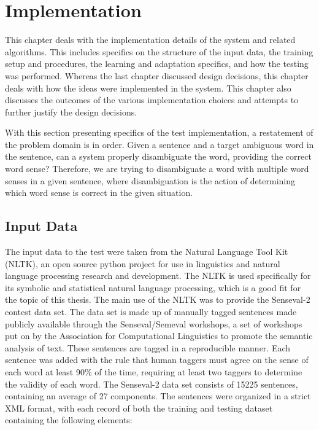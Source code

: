\chapter{Implementation}

This chapter deals with the implementation details of the system and related 
algorithms. This includes specifics on the structure of the
input data, the training setup and procedures, the learning and adaptation
specifics, and how the testing was performed. Whereas the last chapter discussed 
design decisions, this chapter deals with how
the ideas were implemented in the system. This chapter also discusses the outcomes of
the various implementation choices and attempts to further justify the design
decisions.

With this section presenting specifics of the test implementation, a restatement of
the problem domain is in order.  Given a sentence and a target ambiguous word in
the sentence, can a system properly disambiguate the word, providing the correct
word sense?  Therefore, we are trying to disambiguate a word with multiple word
senses in a given sentence, where disambiguation is the action of determining
which word sense is correct in the given situation.

\section{Input Data} 

The input data to the test were taken from the Natural
Language Tool Kit (NLTK), an open source python project for use in linguistics
and natural language processing research and development\cite{NLTK}.  The NLTK is used
specifically for its symbolic and statistical natural language processing, which
is a good fit for the topic of this thesis.  The main use of the NLTK was to
provide the Senseval-2 contest data set. The data set is made up of manually
tagged sentences made publicly available through the Senseval/Semeval workshops,
a set of workshops put on by the Association for Computational Linguistics to
promote the semantic analysis of text. These sentences are tagged in a
reproducible manner. Each sentence was added with the rule that human taggers
must agree on the sense of each word at least 90\% of the time, requiring at
least two taggers to determine the validity of each word.  The Senseval-2
data set consists of 15225 sentences, containing an average of 27 components. The
sentences were organized in a strict XML format, with each record of both the 
training and testing dataset containing the following elements:

